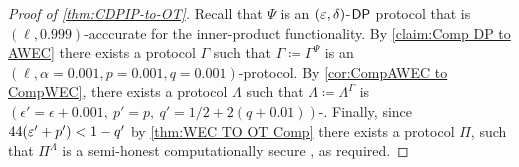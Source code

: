 \begin{proof}[Proof of \cref{thm:CDPIP-to-OT}]
Recall that $\Psi$ is an $(\varepsilon,\delta)$-${\sf DP}$ protocol that is $(\ell,0.999)$-acccurate for the inner-product functionality. By \cref{claim:Comp DP to AWEC} there exists a \ppt protocol $\Gamma$ such that $\Gamma\coloneqq\Gamma^\Psi$ is an $(\ell, \alpha=0.001, p=0.001, q=0.001)$-\CompAWEC protocol. By \cref{cor:CompAWEC to CompWEC}, there exists a \ppt protocol $\Lambda$ such that $\Lambda\coloneqq \Lambda^\Gamma$ is $(\epsilon'=\epsilon+0.001,\: p' = p ,\:  q' = 1/2 + 2(q+0.01))$-\CompWEC. Finally, since $44(\varepsilon'+p')<1-q'$ by  \cref{thm:WEC TO OT Comp} there exists a \ppt protocol $\Pi$, such that $\Pi^{\Lambda}$ is a semi-honest computationally secure \OT, as required.
\end{proof}